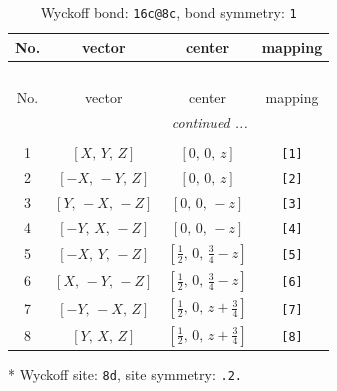 \documentclass[fleqn,8pt]{jsarticle}
\begin{document}
\renewcommand{\arraystretch}{1.2}
\begin{longtable}{cccc}
\caption{Wyckoff bond: {\tt 16c@8c}, bond symmetry: {\tt 1}}
 \\
 \hline \hline
No. & vector & center & mapping \\ \hline \endfirsthead

\multicolumn{3}{l}{\tablename\ \thetable{}} \\
 \hline \hline
No. & vector & center & mapping \\ \hline \endhead

 \hline \hline
\multicolumn{3}{r}{\footnotesize\it continued ...} \\ \endfoot

 \hline \hline
\multicolumn{3}{r}{} \\ \endlastfoot

1 & $\left[ X,\, Y,\, Z \right]$ & $\left[ 0,\, 0,\, z \right]$ & {\tt [1]} \\ \hline
2 & $\left[ - X,\, - Y,\, Z \right]$ & $\left[ 0,\, 0,\, z \right]$ & {\tt [2]} \\ \hline
3 & $\left[ Y,\, - X,\, - Z \right]$ & $\left[ 0,\, 0,\, - z \right]$ & {\tt [3]} \\ \hline
4 & $\left[ - Y,\, X,\, - Z \right]$ & $\left[ 0,\, 0,\, - z \right]$ & {\tt [4]} \\ \hline
5 & $\left[ - X,\, Y,\, - Z \right]$ & $\left[ \frac{1}{2},\, 0,\, \frac{3}{4} - z \right]$ & {\tt [5]} \\ \hline
6 & $\left[ X,\, - Y,\, - Z \right]$ & $\left[ \frac{1}{2},\, 0,\, \frac{3}{4} - z \right]$ & {\tt [6]} \\ \hline
7 & $\left[ - Y,\, - X,\, Z \right]$ & $\left[ \frac{1}{2},\, 0,\, z + \frac{3}{4} \right]$ & {\tt [7]} \\ \hline
8 & $\left[ Y,\, X,\, Z \right]$ & $\left[ \frac{1}{2},\, 0,\, z + \frac{3}{4} \right]$ & {\tt [8]} \\
\end{longtable}
* Wyckoff site: {\tt 8d}, site symmetry: {\tt .2.}
\renewcommand{\arraystretch}{1.2}
\end{document}
